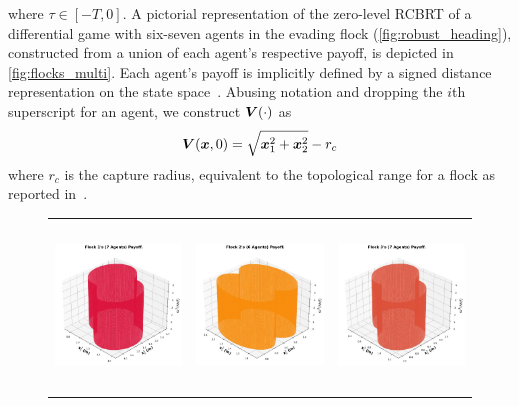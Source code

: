 %
where $\tau \in  [-T, 0]$. A pictorial representation of the zero-level RCBRT of a differential  game with six-seven agents in the evading flock (\cf\autoref{fig:robust_heading}), constructed from a union of each agent's respective payoff,  is depicted in \autoref{fig:flocks_multi}. Each agent's payoff is implicitly defined by a signed distance representation on the state space~\cite{LevelSetsBook}. Abusing notation and dropping the $i$th superscript for an agent, we construct $\bm{V}(\cdot)$ as 
%
\begin{align}
	\bm{V}(\bm{x}, 0) = \sqrt{\bm{x}_1^2 + \bm{x}_2^2} - r_c
\end{align}
%
where $r_c$ is the capture radius, equivalent to the topological range for a flock as reported in~\cite{Ballerini1232}. 

\begin{figure}[tb!]
	\centering
	\begin{tabular}{ccc} 
		\includegraphics[height=12em,width=10em]{figures/flock_1.jpg} 
		&
		\includegraphics[height=12em,width=10em]{figures/flock_2.jpg} 
		& 
		\includegraphics[height=12em,width=10em]{figures/flock_3.jpg} 
		\\	

\end{tabular}
\end{figure}
